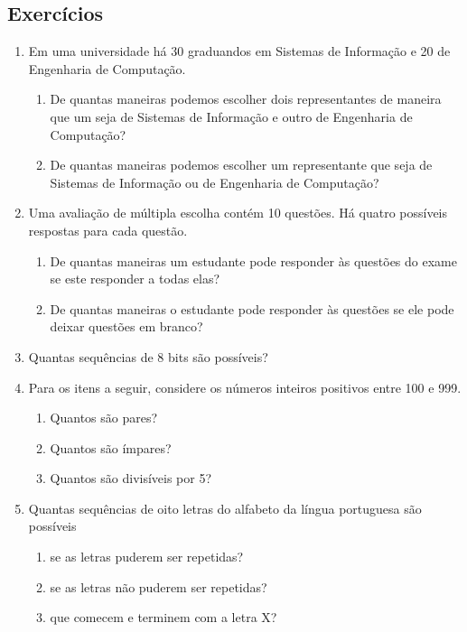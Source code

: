\subsection{Exercícios}

\begin{enumerate}
   \item Em uma universidade há 30 graduandos em Sistemas de
     Informação e 20 de Engenharia de Computação.
   \begin{enumerate}
       \item De quantas maneiras podemos escolher dois representantes
         de maneira que um seja de Sistemas de Informação e outro de
         Engenharia de Computação?
      \item De quantas maneiras podemos escolher um representante que
        seja de Sistemas de Informação ou de Engenharia de Computação?
   \end{enumerate}
   \item Uma avaliação de múltipla escolha contém 10 questões. Há
     quatro possíveis respostas para cada questão.
     \begin{enumerate}
         \item De quantas maneiras um estudante pode responder às
           questões do exame se este responder a todas elas?
        \item De quantas maneiras o estudante pode responder às
          questões se ele pode deixar questões em branco?
     \end{enumerate}
     \item Quantas sequências de 8 bits são possíveis?
     \item Para os itens a seguir, considere os números inteiros
       positivos entre 100 e 999.
       \begin{enumerate}
         \item Quantos são pares?
         \item Quantos são ímpares?
         \item Quantos são divisíveis por 5?
       \end{enumerate}
     \item Quantas sequências de oito letras do alfabeto da língua
       portuguesa são possíveis
     \begin{enumerate}
         \item se as letras puderem ser repetidas?
         \item se as letras não puderem ser repetidas?
         \item que comecem e terminem com a letra X?

\end{enumerate}
\end{enumerate}
